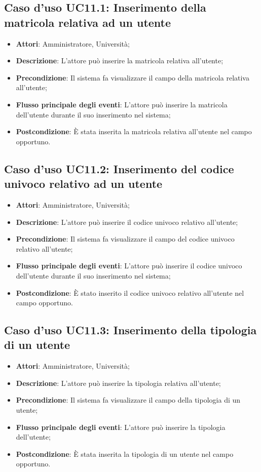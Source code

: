 \subsection{Caso d'uso \texorpdfstring{UC11.1}{UC11.1}: Inserimento della matricola relativa ad un utente}
\begin{itemize}
	\item \textbf{Attori}: Amministratore, Università;
	\item \textbf{Descrizione}: L'attore può inserire la matricola relativa all'utente;
	\item \textbf{Precondizione}: Il sistema fa visualizzare il campo della matricola relativa all'utente;
	\item \textbf{Flusso principale degli eventi}: L'attore può inserire la matricola dell'utente durante il suo inserimento nel sistema;
	\item \textbf{Postcondizione}: È stata inserita la matricola relativa all'utente nel campo opportuno.
\end{itemize}
\subsection{Caso d'uso \texorpdfstring{UC11.2}{UC11.2}: Inserimento del codice univoco relativo ad un utente}
\begin{itemize}
	\item \textbf{Attori}: Amministratore, Università;
	\item \textbf{Descrizione}: L'attore può inserire il codice univoco relativo all'utente;
	\item \textbf{Precondizione}: Il sistema fa visualizzare il campo del codice univoco relativo all'utente;
	
	\item \textbf{Flusso principale degli eventi}: L'attore può inserire il codice univoco dell'utente durante il suo inserimento nel sistema;
	\item \textbf{Postcondizione}: È stato inserito il codice univoco relativo all'utente nel campo opportuno.
	
\end{itemize}
\subsection{Caso d'uso \texorpdfstring{UC11.3}{UC11.3}: Inserimento della tipologia di un utente }
\begin{itemize}
	\item \textbf{Attori}: Amministratore, Università;
	\item \textbf{Descrizione}: L'attore può inserire la tipologia relativa all'utente;
	\item \textbf{Precondizione}: Il sistema fa visualizzare il campo della tipologia di un utente;
	
	\item \textbf{Flusso principale degli eventi}: L'attore può inserire la tipologia dell'utente;
	\item \textbf{Postcondizione}: È stata inserita la tipologia di un utente nel campo opportuno.
	
\end{itemize}

